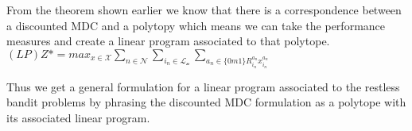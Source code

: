From the theorem shown earlier we know that there is a correspondence between a discounted MDC and a polytopy which means we can take the performance measures and create a linear program associated to that polytope.\\

$(LP) Z* = max_{x \in \mathcal{X}} \sum_{n \in \mathcal{N}} \sum_{i_n \in \mathcal{L_n}} 
\sum_{a_n \in \{ 0m1\} R_{i_n}^{a_n} x_{i_n}^{a_n}} $

Thus we get a general formulation for a linear program associated to the restless bandit problems by phrasing the discounted MDC formulation as a polytope with its associated linear program. 
